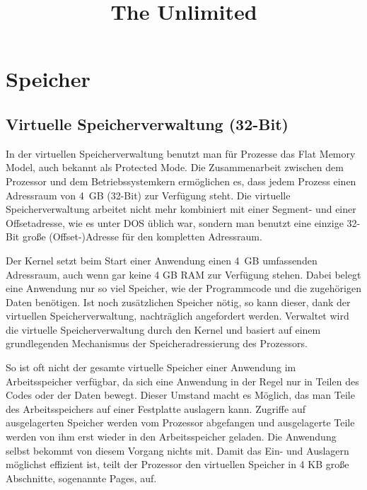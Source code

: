 \documentclass[12pt]{book}
\begin{document}
\title{The Unlimited}
\maketitle

\chapter{Speicher}

\section{Virtuelle Speicherverwaltung (32-Bit)}

In der virtuellen Speicherverwaltung benutzt man für Prozesse das Flat Memory
Model, auch bekannt als Protected Mode. Die Zusammenarbeit zwischen dem
Prozessor und dem Betriebssystemkern ermöglichen es, dass jedem Prozess einen
Adressraum von 4 GB (32-Bit) zur Verfügung steht. Die virtuelle
Speicherverwaltung arbeitet nicht mehr kombiniert mit einer Segment- und einer
Offsetadresse, wie es unter DOS üblich war, sondern man benutzt eine einzige
32-Bit große (Offset-)Adresse für den kompletten Adressraum.

Der Kernel setzt beim Start einer Anwendung einen 4 GB umfassenden
Adressraum, auch wenn gar keine 4 GB RAM zur Verfügung stehen. Dabei belegt
eine Anwendung nur so viel Speicher, wie der Programmcode und die zugehörigen
Daten benötigen. Ist noch zusätzlichen Speicher nötig, so kann
dieser, dank der virtuellen Speicherverwaltung, nachträglich angefordert werden.
Verwaltet wird die virtuelle Speicherverwaltung durch den Kernel und basiert
auf einem grundlegenden Mechanismus der Speicheradressierung des Prozessors.

So ist oft nicht der gesamte virtuelle Speicher einer Anwendung im
Arbeitsspeicher verfügbar, da sich eine Anwendung in der Regel nur in Teilen des
Codes oder der Daten bewegt. Dieser Umstand macht es Möglich, das man Teile des
Arbeitsspeichers auf einer Festplatte auslagern kann. Zugriffe auf ausgelagerten
Speicher werden vom Prozessor abgefangen und ausgelagerte Teile werden von ihm
erst wieder in den Arbeitsspeicher geladen. Die Anwendung selbst bekommt von
diesem Vorgang nichts mit. Damit das Ein- und Auslagern möglichst effizient ist,
teilt der Prozessor den virtuellen Speicher in 4 KB große Abschnitte, sogenannte
Pages, auf.
\end{document}
